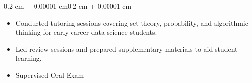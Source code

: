 \documentclass[10pt, letterpaper]{article}
\newenvironment{highlights}{
    \begin{itemize}[
        topsep=0.10 cm,
        parsep=0.10 cm,
        partopsep=0pt,
        itemsep=0pt,
        leftmargin=0.4 cm + 10pt
    ]
}{\end{itemize}}
\newenvironment{onecolentry}{
    \begin{adjustwidth}{0.2 cm + 0.00001 cm}{0.2 cm + 0.00001 cm}
}{\end{adjustwidth}}
\newenvironment{twocolentry}[2][]{
    \onecolentry
    \def\secondColumn{#2}
    \setcolumnwidth{\fill, 4.5 cm}
    \begin{paracol}{2}
}{
    \switchcolumn \raggedleft \secondColumn
    \end{paracol}
    \endonecolentry
}
\begin{document}
    \vspace{0.10 cm}
    \begin{onecolentry}
        \begin{highlights}
            \item Conducted tutoring sessions covering set theory, probability, and algorithmic thinking for early‑career data science students.
            \item Led review sessions and prepared supplementary materials to aid student learning.
            \item Supervised Oral Exam
        \end{highlights}
    \end{onecolentry}

    \vspace{0.15 cm}





\end{document}
